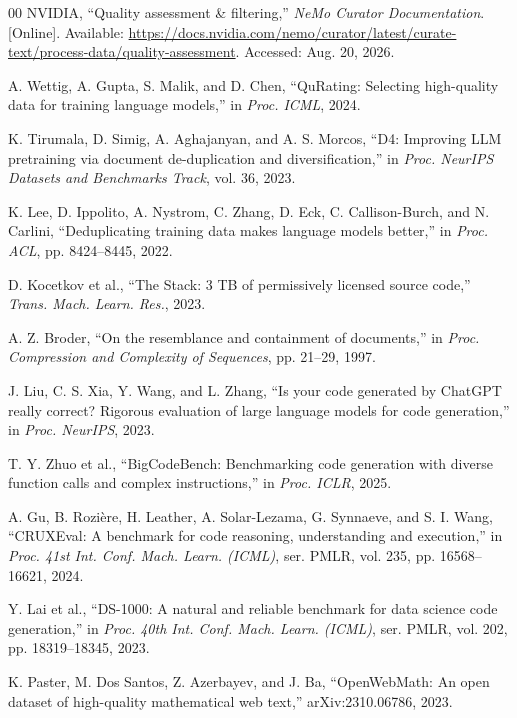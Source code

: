 \documentclass[conference]{IEEEtran}
\begin{document}
\begin{thebibliography}{00}
NVIDIA, ``Quality assessment \& filtering,'' \emph{NeMo Curator
Documentation}. [Online]. Available:
\url{https://docs.nvidia.com/nemo/curator/latest/curate-text/process-data/quality-assessment}.
Accessed: Aug. 20, 2026.

A. Wettig, A. Gupta, S. Malik, and D. Chen, ``QuRating: Selecting high-quality
data for training language models,'' in \emph{Proc. ICML}, 2024.

K. Tirumala, D. Simig, A. Aghajanyan, and A. S. Morcos, ``D4: Improving LLM
pretraining via document de-duplication and diversification,'' in
\emph{Proc. NeurIPS Datasets and Benchmarks Track}, vol. 36, 2023.

K. Lee, D. Ippolito, A. Nystrom, C. Zhang, D. Eck, C. Callison-Burch, and
N. Carlini, ``Deduplicating training data makes language models better,'' in
\emph{Proc. ACL}, pp. 8424--8445, 2022.

D. Kocetkov et al., ``The Stack: 3 TB of permissively licensed source code,''
\emph{Trans. Mach. Learn. Res.}, 2023.

A. Z. Broder, ``On the resemblance and containment of documents,'' in
\emph{Proc. Compression and Complexity of Sequences}, pp. 21--29, 1997.

J. Liu, C. S. Xia, Y. Wang, and L. Zhang, ``Is your code generated by ChatGPT
really correct? Rigorous evaluation of large language models for code
generation,'' in \emph{Proc. NeurIPS}, 2023.

T. Y. Zhuo et al., ``BigCodeBench: Benchmarking code generation with diverse
function calls and complex instructions,'' in \emph{Proc. ICLR}, 2025.

A. Gu, B. Rozi\`ere, H. Leather, A. Solar-Lezama, G. Synnaeve, and S. I. Wang,
``CRUXEval: A benchmark for code reasoning, understanding and execution,''
in \emph{Proc. 41st Int. Conf. Mach. Learn. (ICML)}, ser. PMLR, vol. 235,
pp. 16568--16621, 2024.

Y. Lai et al., ``DS-1000: A natural and reliable benchmark for data science
code generation,'' in \emph{Proc. 40th Int. Conf. Mach. Learn. (ICML)},
ser. PMLR, vol. 202, pp. 18319--18345, 2023.

K. Paster, M. Dos Santos, Z. Azerbayev, and J. Ba, ``OpenWebMath: An open
dataset of high-quality mathematical web text,'' arXiv:2310.06786, 2023.


\end{thebibliography}
\end{document}
